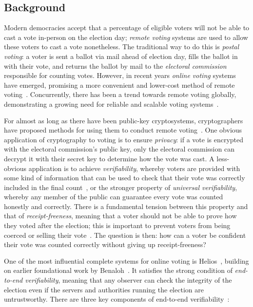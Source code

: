\documentclass[12pt,a4paper]{article}
\theoremstyle{definition}
\begin{document}
\subsection{Background}
Modern democracies accept that a percentage of eligible voters will not be able to cast a vote in-person on the election day; \textit{remote voting} systems are used to allow these voters to cast a vote nonetheless. The traditional way to do this is \textit{postal voting}: a voter is sent a ballot via mail ahead of election day, fills the ballot in with their vote, and returns the ballot by mail to the \textit{electoral commission} responsible for counting votes. However, in recent years \textit{online voting} systems have emerged, promising a more convenient and lower-cost method of remote voting~\cite{nswivote,scytlsvote}. Concurrently, there has been a trend towards remote voting globally, demonstrating a growing need for reliable and scalable voting systems~\cite{VEC_PostalVoting_Position,rallings2010,gjosteen2011norwegian}.

For almost as long as there have been public-key cryptosystems, cryptographers have proposed methods for using them to conduct remote voting~\cite{cohen1985robust}. One obvious application of cryptography to voting is to ensure \textit{privacy}: if a vote is encrypted with the electoral commission's public key, only the electoral commission can decrypt it with their secret key to determine how the vote was cast. A less-obvious application is to achieve \textit{verifiability}, whereby voters are provided with some kind of information that can be used to check that their vote was correctly included in the final count~\cite{benaloh1987verifiable}, or the stronger property of \textit{universal verifiability}, whereby any member of the public can guarantee every vote was counted honestly and correctly. There is a fundamental tension between this property and that of \textit{receipt-freeness}, meaning that a voter should not be able to prove how they voted after the election; this is important to prevent voters from being coerced or selling their vote~\cite{benaloh1994receipt}. The question is then: how can a voter be confident their vote was counted correctly without giving up receipt-freeness?

One of the most influential complete systems for online voting is Helios~\cite{adida2008helios}, building on earlier foundational work by Benaloh~\cite{benaloh2006simple}. It satisfies the strong condition of \textit{end-to-end verifiability}, meaning that any observer can check the integrity of the election even if the servers and authorities running the election are untrustworthy. There are three key components of end-to-end verifiability~\cite{DBLP:journals/corr/BenalohRRSTV15}:
\end{document}

